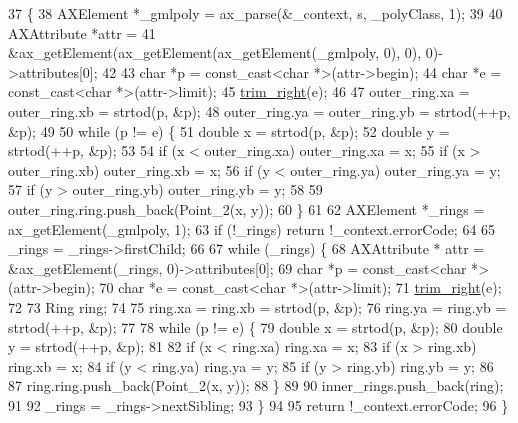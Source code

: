 \begin{DoxyCode}
37     \{
38         AXElement *\_gmlpoly = ax\_parse(&\_context, s, \_polyClass, 1);
39 
40         AXAttribute *attr =
41             &ax\_getElement(ax\_getElement(ax\_getElement(\_gmlpoly, 0), 0), 0)->attributes[0];
42 
43         \textcolor{keywordtype}{char} *p = \textcolor{keyword}{const\_cast<}\textcolor{keywordtype}{char} *\textcolor{keyword}{>}(attr->begin);
44         \textcolor{keywordtype}{char} *e = \textcolor{keyword}{const\_cast<}\textcolor{keywordtype}{char} *\textcolor{keyword}{>}(attr->limit);
45         \hyperlink{classSigSpatial2013_1_1GMLParser_a57eafa968caebbba840d6a58a2c562dc}{trim\_right}(e);
46 
47         outer\_ring.xa = outer\_ring.xb = strtod(p, &p);
48         outer\_ring.ya = outer\_ring.yb = strtod(++p, &p);
49 
50         \textcolor{keywordflow}{while} (p != e) \{
51             \textcolor{keywordtype}{double} x = strtod(p, &p);
52             \textcolor{keywordtype}{double} y = strtod(++p, &p);
53 
54             \textcolor{keywordflow}{if} (x < outer\_ring.xa) outer\_ring.xa = x;
55             \textcolor{keywordflow}{if} (x > outer\_ring.xb) outer\_ring.xb = x;
56             \textcolor{keywordflow}{if} (y < outer\_ring.ya) outer\_ring.ya = y;
57             \textcolor{keywordflow}{if} (y > outer\_ring.yb) outer\_ring.yb = y;
58 
59             outer\_ring.ring.push\_back(Point\_2(x, y));
60         \}
61 
62         AXElement *\_rings = ax\_getElement(\_gmlpoly, 1);
63         \textcolor{keywordflow}{if} (!\_rings) \textcolor{keywordflow}{return} !\_context.errorCode;
64 
65         \_rings = \_rings->firstChild;
66 
67         \textcolor{keywordflow}{while} (\_rings) \{
68             AXAttribute * attr = &ax\_getElement(\_rings, 0)->attributes[0];
69             \textcolor{keywordtype}{char} *p = \textcolor{keyword}{const\_cast<}\textcolor{keywordtype}{char} *\textcolor{keyword}{>}(attr->begin);
70             \textcolor{keywordtype}{char} *e = \textcolor{keyword}{const\_cast<}\textcolor{keywordtype}{char} *\textcolor{keyword}{>}(attr->limit);
71             \hyperlink{classSigSpatial2013_1_1GMLParser_a57eafa968caebbba840d6a58a2c562dc}{trim\_right}(e);
72 
73             Ring ring;
74 
75             ring.xa = ring.xb = strtod(p, &p);
76             ring.ya = ring.yb = strtod(++p, &p);
77 
78             \textcolor{keywordflow}{while} (p != e) \{
79                 \textcolor{keywordtype}{double} x = strtod(p, &p);
80                 \textcolor{keywordtype}{double} y = strtod(++p, &p);
81 
82                 \textcolor{keywordflow}{if} (x < ring.xa) ring.xa = x;
83                 \textcolor{keywordflow}{if} (x > ring.xb) ring.xb = x;
84                 \textcolor{keywordflow}{if} (y < ring.ya) ring.ya = y;
85                 \textcolor{keywordflow}{if} (y > ring.yb) ring.yb = y;
86 
87                 ring.ring.push\_back(Point\_2(x, y));
88             \}
89 
90             inner\_rings.push\_back(ring);
91 
92             \_rings = \_rings->nextSibling;
93         \}
94 
95         \textcolor{keywordflow}{return} !\_context.errorCode;
96     \}
\end{DoxyCode}
